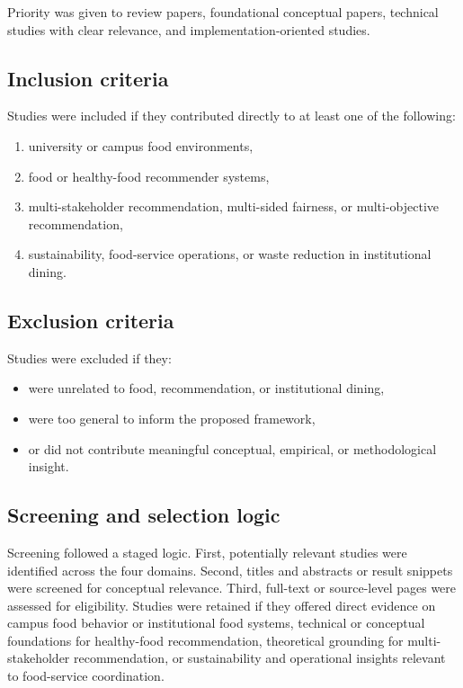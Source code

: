 \documentclass[journal]{IEEEtran}
\begin{document}
Priority was given to review papers, foundational conceptual papers,
technical studies with clear relevance, and implementation-oriented
studies.

\subsection{Inclusion criteria}\label{inclusion-criteria}

Studies were included if they contributed directly to at least one of
the following:

\begin{enumerate}
\def\labelenumi{\arabic{enumi}.}
\tightlist
\item
  university or campus food environments,
\item
  food or healthy-food recommender systems,
\item
  multi-stakeholder recommendation, multi-sided fairness, or
  multi-objective recommendation,
\item
  sustainability, food-service operations, or waste reduction in
  institutional dining.
\end{enumerate}

\subsection{Exclusion criteria}\label{exclusion-criteria}

Studies were excluded if they:

\begin{itemize}
\tightlist
\item
  were unrelated to food, recommendation, or institutional dining,
\item
  were too general to inform the proposed framework,
\item
  or did not contribute meaningful conceptual, empirical, or
  methodological insight.
\end{itemize}

\subsection{Screening and selection
logic}\label{screening-and-selection-logic}

Screening followed a staged logic. First, potentially relevant studies
were identified across the four domains. Second, titles and abstracts or
result snippets were screened for conceptual relevance. Third, full-text
or source-level pages were assessed for eligibility. Studies were
retained if they offered direct evidence on campus food behavior or
institutional food systems, technical or conceptual foundations for
healthy-food recommendation, theoretical grounding for multi-stakeholder
recommendation, or sustainability and operational insights relevant to
food-service coordination.
\end{document}
